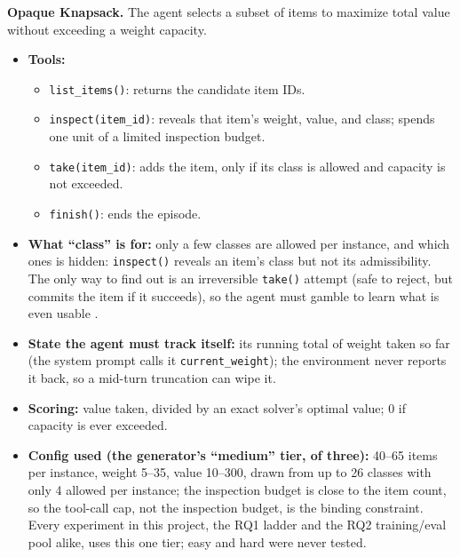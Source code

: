 \documentclass[11pt,a4paper]{article}
\begin{document}
\textbf{Opaque Knapsack.} The agent selects a subset of items to maximize total value without
exceeding a weight capacity.
\begin{itemize}
\item \textbf{Tools:}
  \begin{itemize}
  \item \texttt{list\_items()}: returns the candidate item IDs.
  \item \texttt{inspect(item\_id)}: reveals that item's weight, value, and class; spends one
    unit of a limited inspection budget.
  \item \texttt{take(item\_id)}: adds the item, only if its class is allowed and capacity is
    not exceeded.
  \item \texttt{finish()}: ends the episode.
  \end{itemize}
\item \textbf{What ``class'' is for:} only a few classes are allowed per instance, and which
  ones is hidden: \texttt{inspect()} reveals an item's class but not its admissibility. The only
  way to find out is an irreversible \texttt{take()} attempt (safe to reject, but commits the
  item if it succeeds), so the agent must gamble to learn what is even usable \cite{paper}.
\item \textbf{State the agent must track itself:} its running total of weight taken so far (the
  system prompt calls it \texttt{current\_weight}); the environment never reports it back, so a
  mid-turn truncation can wipe it.
\item \textbf{Scoring:} value taken, divided by an exact solver's optimal value; 0 if capacity is
  ever exceeded.
\item \textbf{Config used (the generator's ``medium'' tier, of three):} 40--65 items per
  instance, weight 5--35, value 10--300, drawn from up to 26 classes with only 4 allowed per
  instance; the inspection budget is close to the item count, so the tool-call cap, not the
  inspection budget, is the binding constraint. Every experiment in this project, the RQ1 ladder
  and the RQ2 training/eval pool alike, uses this one tier; easy and hard were never tested.
\end{itemize}
\end{document}

